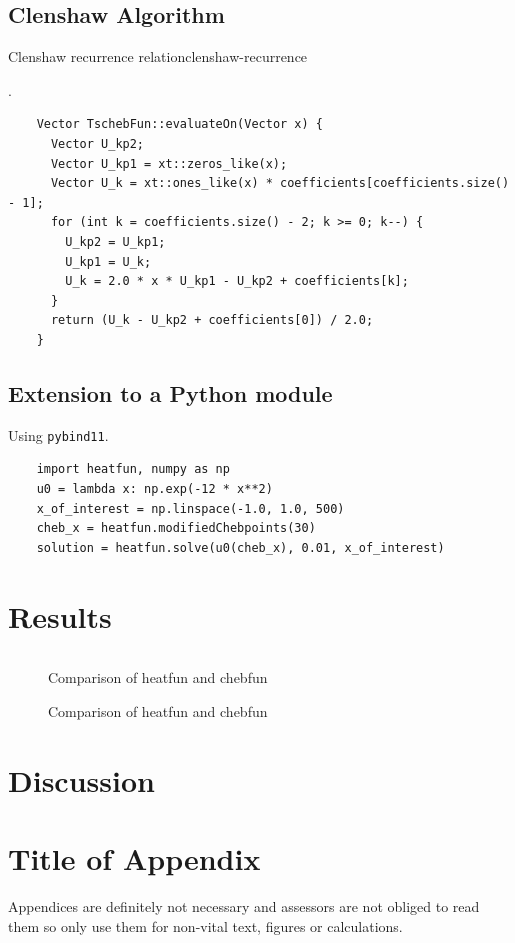 \documentclass[12pt, a4paper]{article}
\begin{document}
  \subsection{Clenshaw Algorithm}
  \begin{theorem}{Clenshaw recurrence relation}{clenshaw-recurrence}
  \end{theorem}
  \parencite[172-178]{art-of-sci-comp}.

  \begin{verbatim}
    Vector TschebFun::evaluateOn(Vector x) {
      Vector U_kp2;
      Vector U_kp1 = xt::zeros_like(x);
      Vector U_k = xt::ones_like(x) * coefficients[coefficients.size() - 1];
      for (int k = coefficients.size() - 2; k >= 0; k--) {
        U_kp2 = U_kp1;
        U_kp1 = U_k;
        U_k = 2.0 * x * U_kp1 - U_kp2 + coefficients[k];
      }
      return (U_k - U_kp2 + coefficients[0]) / 2.0;
    }
  \end{verbatim}

  \subsection{Extension to a Python module}
  Using \texttt{pybind11}.

  \begin{verbatim}
    import heatfun, numpy as np
    u0 = lambda x: np.exp(-12 * x**2)
    x_of_interest = np.linspace(-1.0, 1.0, 500)
    cheb_x = heatfun.modifiedChebpoints(30)
    solution = heatfun.solve(u0(cheb_x), 0.01, x_of_interest)
  \end{verbatim}

  \section{Results}
  \inputminted{matlab}{../analysis/heatfun.m}


  \begin{figure}[H]
    \centering
    \caption{Comparison of heatfun and chebfun}
  \end{figure}

  \begin{figure}[H]
    \centering
    \caption{Comparison of heatfun and chebfun}
  \end{figure}

  \section{Discussion}

  \printbibliography

  \appendix
  \section{Title of Appendix}
  Appendices are definitely not necessary and assessors are not obliged to read them so only use them for non-vital text, figures or calculations.
\end{document}
